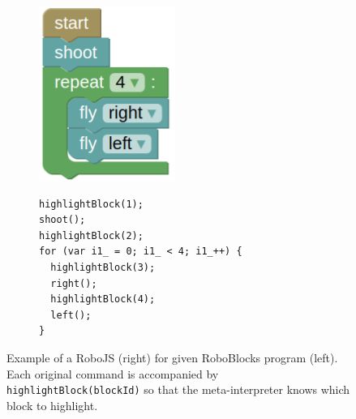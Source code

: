 

\begin{figure}[h]
\begin{subfigure}{.28\textwidth}
\centering\includegraphics[width=.8\textwidth]{img/roboblocks-english}
\end{subfigure}
\begin{subfigure}{.7\textwidth}
{\lstset{numbers=none}
\begin{lstlisting}
highlightBlock(1);
shoot();
highlightBlock(2);
for (var i1_ = 0; i1_ < 4; i1_++) {
  highlightBlock(3);
  right();
  highlightBlock(4);
  left();
}
\end{lstlisting}}
\end{subfigure}
\caption{%
  Example of a RoboJS (right) for given RoboBlocks program (left). %
  Each original command is accompanied by \texttt{highlightBlock(blockId)}
  so that the meta-interpreter knows which block to highlight.}
\label{fig:robojs-example}
\end{figure}


